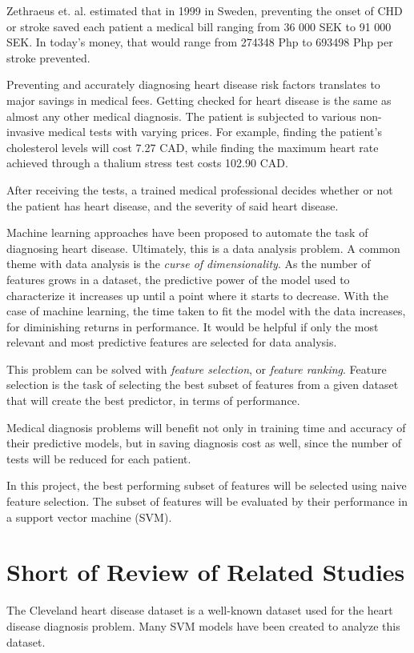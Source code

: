 \documentclass[conference]{IEEEtran}
\begin{document}
	Zethraeus et. al.\cite{bib:stroke_save} estimated that in 1999 in Sweden, preventing the onset of CHD or stroke saved each patient a medical bill ranging from 36 000 SEK to 91 000 SEK.
	In today's money, that would range from 274348 Php to 693498 Php per stroke prevented. \cite{bib:secpi}

	Preventing and accurately diagnosing heart disease risk factors translates to major savings in medical fees.
	Getting checked for heart disease is the same as almost any other medical diagnosis.
	The patient is subjected to various non-invasive medical tests with varying prices.
	For example, finding the patient's cholesterol levels will cost 7.27 CAD, while finding the maximum heart rate achieved through a thalium stress test costs 102.90 CAD. \cite{bib:dataset}

	After receiving the tests, a trained medical professional decides whether or not the patient has heart disease, and the severity of said heart disease.

	Machine learning approaches have been proposed to automate the task of diagnosing heart disease.\cite{bib:dataset} \cite{bib:mltech}
	Ultimately, this is a data analysis problem.
	A common theme with data analysis is the \emph{curse of dimensionality}.
	As the number of features grows in a dataset, the predictive power of the model used to characterize it increases up until a point where it starts to decrease. \cite{bib:curse}
	With the case of machine learning, the time taken to fit the model with the data increases, for diminishing returns in performance.
	It would be helpful if only the most relevant and most predictive features are selected for data analysis.

	This problem can be solved with \emph{feature selection}, or \emph{feature ranking}.
	Feature selection is the task of selecting the best subset of features from a given dataset that will create the best predictor, in terms of performance.

	Medical diagnosis problems will benefit not only in training time and accuracy of their predictive models, but in saving diagnosis cost as well, since the number of tests will be reduced for each patient.

	In this project, the best performing subset of features will be selected using naive feature selection.
	The subset of features will be evaluated by their performance in a support vector machine (SVM).


\section{Short of Review of Related Studies}
	The Cleveland heart disease dataset is a well-known dataset used for the heart disease diagnosis problem.
	Many SVM models have been created to analyze this dataset.
\end{document}
